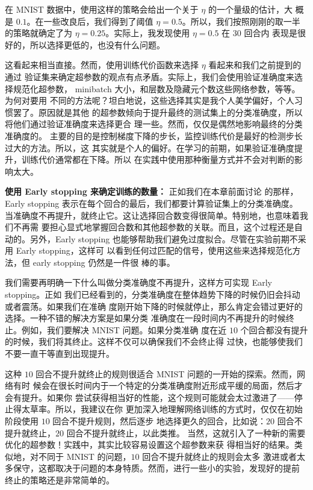 在 MNIST 数据中，使用这样的策略会给出一个关于\learningrate{} $\eta$ 的一个量级的估计，大
概是 $0.1$。在一些改良后，我们得到了阈值 $\eta=0.5$。所以，我们按照刚刚的取一半
的策略就确定了\learningrate{}为 $\eta=0.25$。实际上，我发现使用 $\eta=0.5$ 在 $30$ 回合内
表现是很好的，所以选择更低的\learningrate{}，也没有什么问题。

这看起来相当直接。然而，使用训练代价函数来选择 $\eta$ 看起来和我们之前提到的通过
验证集来确定超参数的观点有点矛盾。实际上，我们会使用验证准确度来选择规范化超参数，
minibatch 大小，和层数及隐藏元个数这些网络参数，等等。为何对\learningrate{}要用
不同的方法呢？坦白地说，这些选择其实是我个人美学偏好，个人习惯罢了。原因就是其他
的超参数倾向于提升最终的测试集上的分类准确度，所以将他们通过验证准确度来选择更合
理一些。然而，\learningrate{}仅仅是偶然地影响最终的分类准确度的。\learningrate{}%
主要的目的是控制梯度下降的步长，监控训练代价是最好的检测步长过大的方法。所以，这
其实就是个人的偏好。在学习的前期，如果验证准确度提升，训练代价通常都在下降。所以
在实践中使用那种衡量方式并不会对判断的影响太大。

\textbf{使用 Early stopping 来确定训练的\epochs{}数量：} 正如我们在本章前面讨论
的那样，Early stopping 表示在每个回合的最后，我们都要计算验证集上的分类准确度。
当准确度不再提升，就终止它。这让选择回合数变得很简单。特别地，也意味着我们不再需
要担心显式地掌握回合数和其他超参数的关联。而且，这个过程还是自动的。另外，Early
stopping 也能够帮助我们避免过度拟合。尽管在实验前期不采用 Early stopping，这样可
以看到任何过匹配的信号，使用这些来选择规范化方法，但 early stopping 仍然是一件很
棒的事。

我们需要再明确一下什么叫做分类准确度不再提升，这样方可实现 Early stopping。正如
我们已经看到的，分类准确度在整体趋势下降的时候仍旧会抖动或者震荡。如果我们在准确
度刚开始下降的时候就停止，那么肯定会错过更好的选择。一种不错的解决方案是如果分类
准确度在一段时间内不再提升的时候终止。例如，我们要解决 MNIST 问题。如果分类准确
度在近 $10$ 个回合都没有提升的时候，我们将其终止。这样不仅可以确保我们不会终止得
过快，也能够使我们不要一直干等直到出现提升。

这种 $10$ 回合不提升就终止的规则很适合 MNIST 问题的一开始的探索。然而，网络有时
候会在很长时间内于一个特定的分类准确度附近形成平缓的局面，然后才会有提升。如果你
尝试获得相当好的性能，这个规则可能就会太过激进了——停止得太草率。所以，我建议在你
更加深入地理解网络训练的方式时，仅仅在初始阶段使用 $10$ 回合不提升规则，然后逐步
地选择更久的回合，比如说：$20$ 回合不提升就终止，$20$ 回合不提升就终止，以此类推。
当然，这就引入了一种新的需要优化的超参数！实践中，其实比较容易设置这个超参数来获
得相当好的结果。类似地，对不同于 MNIST 的问题，$10$ 回合不提升就终止的规则会太多
激进或者太多保守，这都取决于问题的本身特质。然而，进行一些小的实验，发现好的提前
终止的策略还是非常简单的。

